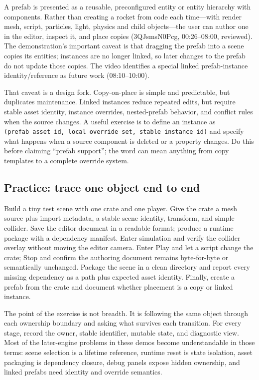 A prefab is presented as a reusable, preconfigured entity or entity hierarchy with components. Rather than creating a rocket from code each time---with render mesh, script, particles, light, physics and child objects---the user can author one in the editor, inspect it, and place copies (3QJsmsN0Pcg, 00:26--08:00, reviewed). The demonstration's important caveat is that dragging the prefab into a scene copies its entities; instances are no longer linked, so later changes to the prefab do not update those copies. The video identifies a special linked prefab-instance identity/reference as future work (08:10--10:00).

That caveat is a design fork. Copy-on-place is simple and predictable, but duplicates maintenance. Linked instances reduce repeated edits, but require stable asset identity, instance overrides, nested-prefab behavior, and conflict rules when the source changes. A useful exercise is to define an instance as \texttt{(prefab\ asset\ id,\ local\ override\ set,\ stable\ instance\ id)} and specify what happens when a source component is deleted or a property changes. Do this before claiming ``prefab support''; the word can mean anything from copy templates to a complete override system.

\subsection{Practice: trace one object end to end}\label{06-engine-ii-ch033-practice-trace-one-object-end-to-end}

Build a tiny test scene with one crate and one player. Give the crate a mesh source plus import metadata, a stable scene identity, transform, and simple collider. Save the editor document in a readable format; produce a runtime package with a dependency manifest. Enter simulation and verify the collider overlay without moving the editor camera. Enter Play and let a script change the crate; Stop and confirm the authoring document remains byte-for-byte or semantically unchanged. Package the scene in a clean directory and report every missing dependency as a path plus expected asset identity. Finally, create a prefab from the crate and document whether placement is a copy or linked instance.

The point of the exercise is not breadth. It is following the same object through each ownership boundary and asking what survives each transition. For every stage, record the owner, stable identifier, mutable state, and diagnostic view. Most of the later-engine problems in these demos become understandable in those terms: scene selection is a lifetime reference, runtime reset is state isolation, asset packaging is dependency closure, debug panels expose hidden ownership, and linked prefabs need identity and override semantics.

